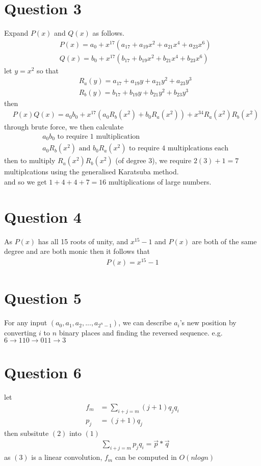 \documentclass{article}
\begin{document}
\section*{Question 3}
Expand $P(x)$ and $Q(x)$ as follows.
\begin{align*}
    & P(x) = a_0 + x^{17}(a_{17} + a_{19}x^{2} + a_{21}x^4 + a_{23}x^6)\\
    & Q(x) = b_0 + x^{17}(b_{17} + b_{19}x^{2} + b_{21}x^4 + b_{23}x^6)
\end{align*}
let $y = x^2$ so that
\begin{align*}
    & R_a(y) = a_{17} + a_{19}y + a_{21}y^2 + a_{23}y^3\\
    & R_b(y) = b_{17} + b_{19}y + b_{21}y^2 + b_{23}y^3
\end{align*}
then
\begin{align*}
    & P(x)Q(x) = a_0b_0 + x^{17}(a_0R_b(x^2) + b_0R_a(x^2)) + x^{34}R_a(x^2)R_b(x^2)
\end{align*}
through brute force, we then calculate
\begin{align*}
    & a_0b_0 \text{ to require 1 multiplication}\\
    & a_0R_b(x^2) \text{ and } b_0R_a(x^2) \text{ to require 4 multiplcations each}
\end{align*}
then to multiply $R_a(x^2)R_b(x^2)$ (of degree 3), we require $2(3)+1 = 7$ multiplcations using the generalised Karatsuba method.\\
and so we get $1 + 4 + 4 + 7 = 16$ multiplications of large numbers.

\section*{Question 4}
As $P(x)$ has all 15 roots of unity, and $x^{15} - 1$ and $P(x)$ are both of the same degree and are both monic then it follows that
\begin{gather*}
P(x) = x^{15} -1
\end{gather*}

\section*{Question 5}
For any input $(a_0, a_1, a_2, ..., a_{2^n-1})$, we can describe $a_i$'s new position by converting $i$ to $n$ binary places and finding the reversed sequence.
e.g. $6 \rightarrow 110 \rightarrow 011 \rightarrow 3$

\section*{Question 6}
let
\begin{align}
    f_m &= \sum_{i+j=m} (j+1)q_jq_i \\
    p_j &= (j+1)q_j
\end{align}
then subsitute $(2)$ into $(1)$
\begin{align}
    & \sum_{i+j=m} p_jq_i = \vec{p} \ast \vec{q}
\end{align}
as $(3)$ is a linear convolution, $f_m$ can be computed in $O(nlog{n})$
\end{document}
